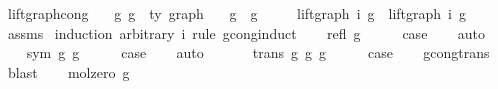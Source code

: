 \begin{isabellebody}
\endisatagproof
{\isafoldproof}%
%
\isadelimproof
\isanewline
%
\endisadelimproof
\isanewline
\isanewline
{}\isamarkupfalse%
\ lift{\isacharunderscore}{\kern0pt}graph{\isacharunderscore}{\kern0pt}cong{\isacharcolon}{\kern0pt}\isanewline
\ \ \ g{}\ g{}\ {\isacharcolon}{\kern0pt}{\isacharcolon}{\kern0pt}\ {\isachardoublequoteopen}{\isacharprime}{\kern0pt}ty\ graph{\isachardoublequoteclose}\isanewline
\ \ \ {\isachardoublequoteopen}g{}\ {\isasymsimeq}\ g{}{\isachardoublequoteclose}\isanewline
\ \ \ \ \ {\isachardoublequoteopen}lift{\isacharunderscore}{\kern0pt}graph\ i\ g{}\ {\isasymsimeq}\ lift{\isacharunderscore}{\kern0pt}graph\ i\ g{}{\isachardoublequoteclose}\isanewline
%
\isadelimproof
\ \ %
\endisadelimproof
%
\isatagproof
{}\isamarkupfalse%
\ assms\isanewline
{}\isamarkupfalse%
\ {\isacharparenleft}{\kern0pt}induction\ arbitrary{\isacharcolon}{\kern0pt}\ i\ rule{\isacharcolon}{\kern0pt}\ gcong{\isachardot}{\kern0pt}induct{\isacharparenright}{\kern0pt}\isanewline
\ \ \isamarkupfalse%
\ {\isacharparenleft}{\kern0pt}refl\ g{\isacharparenright}{\kern0pt}\isanewline
\ \ \isamarkupfalse%
\ \isamarkupfalse%
\ {\isacharquery}{\kern0pt}case\isanewline
\ \ \isamarkupfalse%
\ auto\isanewline
\ \ \isamarkupfalse%
\isanewline
{}\isamarkupfalse%
\isanewline
\ \ \isamarkupfalse%
\ {\isacharparenleft}{\kern0pt}sym\ g{}\ g{}{\isacharparenright}{\kern0pt}\isanewline
\ \ \isamarkupfalse%
\ \isamarkupfalse%
\ {\isacharquery}{\kern0pt}case\isanewline
\ \ \isamarkupfalse%
\ auto\isanewline
\ \ \isamarkupfalse%
\isanewline
{}\isamarkupfalse%
\isanewline
\ \ \isamarkupfalse%
\ {\isacharparenleft}{\kern0pt}trans\ g{}\ g{}\ g{}{\isacharparenright}{\kern0pt}\isanewline
\ \ \isamarkupfalse%
\ \isamarkupfalse%
\ {\isacharquery}{\kern0pt}case\isanewline
\ \ \isamarkupfalse%
\ gcong{\isachardot}{\kern0pt}trans\ \isamarkupfalse%
\ blast\isanewline
{}\isamarkupfalse%
\isanewline
\ \ \isamarkupfalse%
\ {\isacharparenleft}{\kern0pt}mol{\isacharunderscore}{\kern0pt}zero\ g{\isacharparenright}{\kern0pt}\isanewline

\end{isabellebody}
